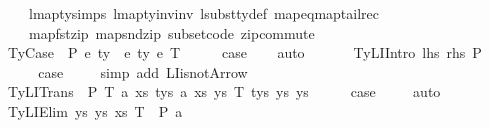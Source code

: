 \begin{isabellebody}
\ \ \ \ lmap{\isacharunderscore}{\kern0pt}ty{\isachardot}{\kern0pt}simps{\isacharparenleft}{\kern0pt}{}{\isacharparenright}{\kern0pt}\ lmap{\isacharunderscore}{\kern0pt}ty{\isacharunderscore}{\kern0pt}inv{\isacharunderscore}{\kern0pt}inv\ lsubst{\isacharunderscore}{\kern0pt}ty{\isacharunderscore}{\kern0pt}def\ map{\isacharunderscore}{\kern0pt}eq{\isacharunderscore}{\kern0pt}map{\isacharunderscore}{\kern0pt}tailrec\isanewline
\ \ \ \ map{\isacharunderscore}{\kern0pt}fst{\isacharunderscore}{\kern0pt}zip\ map{\isacharunderscore}{\kern0pt}snd{\isacharunderscore}{\kern0pt}zip\ subset{\isacharunderscore}{\kern0pt}code{\isacharparenleft}{\kern0pt}{}{\isacharparenright}{\kern0pt}\ zip{\isacharunderscore}{\kern0pt}commute{\isacharparenright}{\kern0pt}\ \ \isanewline
{}\isamarkupfalse%
\isanewline
\ \ \isamarkupfalse%
\ {\isacharparenleft}{\kern0pt}TyCase\ {\isasymGamma}\ P\ e{}\ ty{}\ {\isasymGamma}{}\ e{}\ ty{}\ e{}\ T{\isacharparenright}{\kern0pt}\isanewline
\ \ \isamarkupfalse%
\ \isamarkupfalse%
\ {\isacharquery}{\kern0pt}case\isanewline
\ \ \isamarkupfalse%
\ auto\isanewline
\ \ \isamarkupfalse%
\isanewline
{}\isamarkupfalse%
\isanewline
\ \ \isamarkupfalse%
\ {\isacharparenleft}{\kern0pt}TyLIIntro\ lhs\ rhs\ P\ {\isasymGamma}{\isacharparenright}{\kern0pt}\isanewline
\ \ \isamarkupfalse%
\ \isamarkupfalse%
\ {\isacharquery}{\kern0pt}case\ \isanewline
\ \ \isamarkupfalse%
\ {\isacharparenleft}{\kern0pt}simp\ add{\isacharcolon}{\kern0pt}\ LI{\isacharunderscore}{\kern0pt}isnot{\isacharunderscore}{\kern0pt}Arrow{\isacharparenright}{\kern0pt}\isanewline
{}\isamarkupfalse%
\isanewline
\ \ \isamarkupfalse%
\ {\isacharparenleft}{\kern0pt}TyLITrans\ {\isasymGamma}\ P\ T{}\ a{}\ xs{}\ tys{}\ a{}\ xs{}\ ys{}\ T{}\ tys{}\ ys{}\ ys{\isacharparenright}{\kern0pt}\isanewline
\ \ \isamarkupfalse%
\ \isamarkupfalse%
\ {\isacharquery}{\kern0pt}case\ \isanewline
\ \ \isamarkupfalse%
\ auto\isanewline
\ \ \isamarkupfalse%
\isanewline
{}\isamarkupfalse%
\isanewline
\ \ \isamarkupfalse%
\ {\isacharparenleft}{\kern0pt}TyLIElim{}\ ys\ ys{\isacharprime}{\kern0pt}\ xs\ T\ {\isasymGamma}\ P\ a{\isacharparenright}{\kern0pt}\isanewline

\end{isabellebody}
